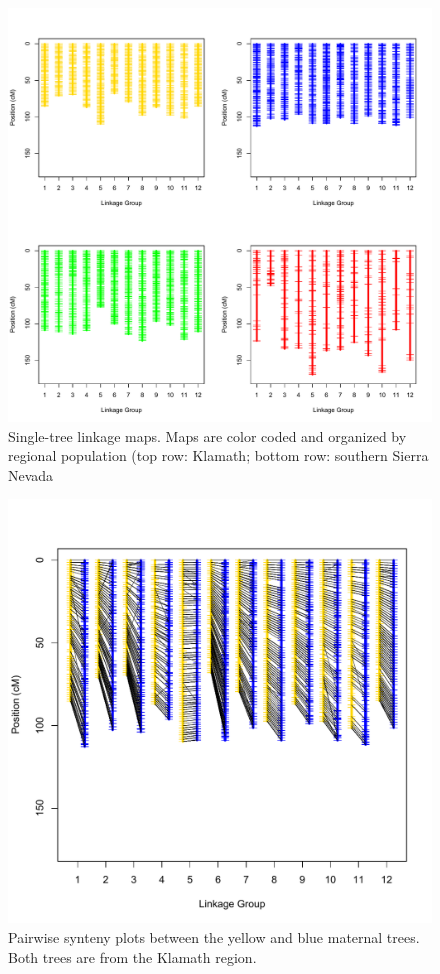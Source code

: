 \documentclass[smallextended]{svjour3}
\begin{document}
\begin{figure}[ht]
  \centering
  \includegraphics[width=\textwidth]{indiv_maps}
  \caption{Single-tree linkage maps. Maps are color coded and organized by regional population (top row: Klamath; bottom row: southern 
  Sierra Nevada}
  \label{f:con}
\end{figure}

\begin{figure}[ht]
  \centering
  \includegraphics[width=\textwidth]{yellow_blue_synteny}
  \caption{Pairwise synteny plots between the yellow and blue maternal trees. Both trees are from the Klamath region.}
  \label{f:con}
\end{figure}
\end{document}
